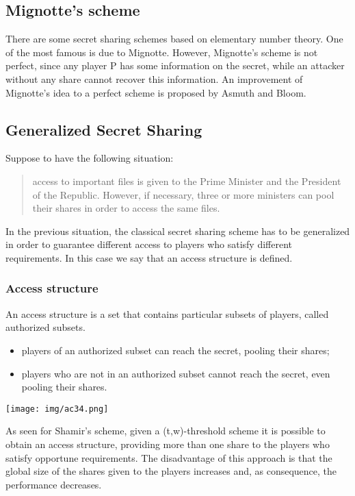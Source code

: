 \documentclass[a4paper, 10pt, titlepage]{article}
\begin{document}
\subsection{Mignotte’s scheme}
There are some secret sharing schemes based on elementary number theory. One of the most famous is due to Mignotte.
However, Mignotte’s scheme is not perfect, since any player P has some information on the secret, while an attacker without any share cannot recover this information. An improvement of Mignotte’s idea to a perfect scheme is proposed by Asmuth and Bloom.

\subsection{Generalized Secret Sharing}
Suppose to have the following situation: 
\begin{quote}
access to important files is given to the Prime Minister and the President of the Republic. However, if necessary, three or more ministers can pool their shares in order to access the same files.
\end{quote}
In the previous situation, the classical secret sharing scheme has to be generalized in order to guarantee different access to players who satisfy different requirements. In this case we say that an access structure is defined.

\subsubsection{Access structure}
An access structure is a set that contains particular subsets of players, called authorized subsets.
\begin{itemize}
\item players of an authorized subset can reach the secret, pooling their shares;
\item players who are not in an authorized subset cannot reach the secret, even pooling their shares.
\end{itemize} 
\begin{center}
\texttt{[image: img/ac34.png]}
\end{center}
As seen for Shamir’s scheme, given a (t,w)-threshold scheme it is possible to obtain an access structure, providing more than one share to the players who satisfy opportune requirements.
The disadvantage of this approach is that the global size of the shares given to the players increases and, as consequence, the performance decreases.
\end{document}
